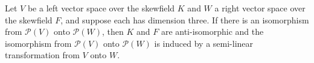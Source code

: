 Let $V$ be a left vector space over the skewfield $K$ and $W$ a right vector space over the skewfield $F$, and suppose each has dimension three. If there is an isomorphism from $\mathcal{P}(V)$ onto $\mathcal{P}(W)$, then $K$ and $F$ are anti-isomorphic and the isomorphism from $\mathcal{P}(V)$ onto $\mathcal{P}(W)$ is induced by a semi-linear transformation from $V$ onto $W$.
